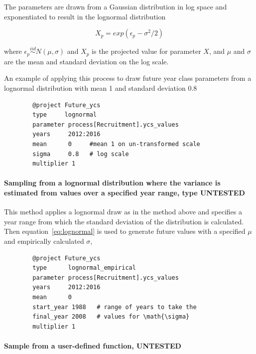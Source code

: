 The parameters are drawn from a Gaussian distribution in log space and exponentiated  to result in the lognormal distribution

\begin{equation}\label{eq:lognormal}
X_p = exp(\epsilon_p - \sigma^2 / 2)
\end{equation}

where $\epsilon_p\stackrel{iid}{\sim}N(\mu,\sigma)$ and $X_p$ is the projected value for parameter $X$, and $\mu$ and $\sigma$ are the mean and standard deviation on the log scale.

An example of applying this process to draw future year class parameters from a lognormal distribution with mean 1 and standard deviation 0.8

{\small{\begin{verbatim}
		@project Future_ycs
		type     lognormal
		parameter process[Recruitment].ycs_values
		years     2012:2016
		mean      0     #mean 1 on un-transformed scale
		sigma     0.8   # log scale
		multiplier 1
		\end{verbatim}}}

\paragraph[Lognormal-Empirical]{Sampling from a lognormal distribution where the  variance is estimated from values over a specified year range, type   UNTESTED}

This method applies a lognormal draw as in the  method above and specifies a year range from which the standard deviation of the distribution is calculated. Then equation~\eqref{eq:lognormal} is used to generate future values with a specified $\mu$ and empirically calculated $\sigma$,

{\small{\begin{verbatim}
		@project Future_ycs
		type      lognormal_empirical
		parameter process[Recruitment].ycs_values
		years     2012:2016
		mean      0
		start_year 1988   # range of years to take the 
		final_year 2008   # values for \math{\sigma}
		multiplier 1
		\end{verbatim}}}

\paragraph[User Defined]{Sample from a user-defined function,   UNTESTED}

